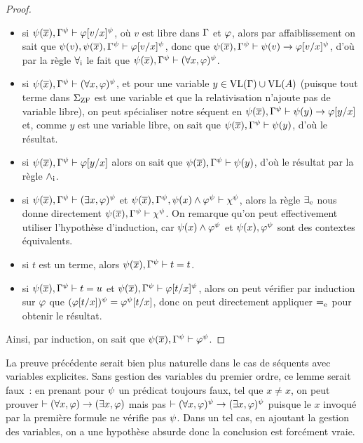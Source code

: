 \begin{proof}
\begin{itemize}
    $\varFP(\vec x),\varCG^\varFP \vdP {\varFF_1}^\varFP$, alors
    $\varFP(\vec x),\varCG^\varFP\vdP {\varFF_2}^\varFP$.
  \item[$\RforaI$~:] si
    $\psi(\overline{x}),\Gamma^\psi\vdash \varphi[v/x]^\psi$, où $v$ est
    libre dans $\Gamma$ et $\varphi$, alors par affaiblissement on sait que
    $\psi(v),\psi(\overline{x}),\Gamma^\psi\vdash\varphi[v/x]^\psi$, donc que
    $\psi(\overline{x}),\Gamma^\psi\vdash\psi(v)\to \varphi[v/x]^\psi$, d'où par la
    règle
    $\RforaI$ le fait que
    $\psi(\overline{x}),\Gamma^\psi \vdash (\forall x,\varphi)^\psi$.
  \item[$\RforaE$~:] si
    $\psi(\overline{x}),\Gamma^\psi \vdash (\forall x,\varphi)^\psi$, et
    pour une variable $y \in \operatorname{VL}(\Gamma)\cup \operatorname{VL}(A)$ (puisque tout terme dans
    $\Sigma_{\operatorname{ZF}}$ est une variable et que la relativisation n'ajoute pas
    de variable libre), on peut spécialiser notre séquent en
    $\psi(\overline{x}),\Gamma^\psi\vdash\psi(y)\to\varphi[y/x]$ et, comme
    $y$ est une variable libre, on sait que
    $\psi(\overline{x}),\Gamma^\psi\vdash\psi(y)$, d'où le résultat.
  \item[$\RexI$~:] si $\psi(\overline{x}),\Gamma^\psi \vdash \varphi[y/x]$ alors on
    sait que $\psi(\overline{x}), \Gamma^\psi\vdash \psi(y)$, d'où le résultat par
    la règle $\mathord{\land}_{\mathrm{i}}$.
  \item[$\RexE$~:] si
    $\psi(\overline{x}),\Gamma^\psi \vdash (\exists x, \varphi)^\psi$ et
    $\psi(\overline{x}),\Gamma^\psi, \psi(x)\land\varphi^\psi\vdash\chi^\psi$,
    alors la règle $\RexE$ nous donne directement
    $\psi(\overline{x}),\Gamma^\psi \vdash \chi^\psi$. On
    remarque qu'on peut effectivement utiliser l'hypothèse d'induction, car
    $\psi(x)\land\varphi^\psi$ et $\psi(x),\varphi^\psi$ sont des
    contextes équivalents.
  \item[$\ReqI$~:] si $t$ est un terme, alors
    $\psi(\overline{x}),\Gamma^\psi\vdash t = t$.
  \item[$\ReqE$~:] si $\psi(\overline{x}),\Gamma^\psi \vdash t = u$ et
    $\psi(\overline{x}), \Gamma^\psi \vdash \varphi[t/x]^\psi$, alors on peut
    vérifier par induction sur $\varphi$ que
    $(\varphi[t/x])^\psi = \varphi^\psi [t/x]$, donc on peut directement
    appliquer $\ReqE$ pour obtenir le résultat.
  \end{itemize}
  Ainsi, par induction, on sait que
  $\psi(\overline{x}),\Gamma^\psi \vdash \varphi^\psi$.
\end{proof}

\begin{remark}
  La preuve précédente serait bien plus naturelle dans le cas de séquents
  avec variables explicites. Sans gestion des variables du premier ordre, ce
  lemme serait faux~: en prenant pour $\psi$ un prédicat toujours faux, tel
  que $x\neq x$, on peut prouver
  $\vdash (\forall x, \varphi)\to (\exists x, \varphi)$ mais pas
  $\vdash (\forall x,\varphi)^\psi \to (\exists x, \varphi)^\psi$ puisque le $x$
  invoqué par la première formule ne vérifie pas $\psi$. Dans un tel cas, en
  ajoutant la gestion des variables, on a une hypothèse absurde donc la
  conclusion est forcément vraie.
\end{remark}

